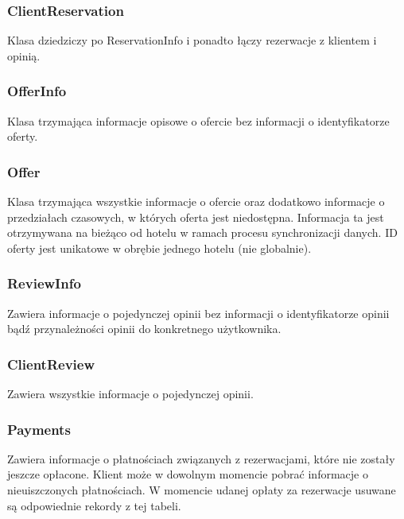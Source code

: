 \documentclass{article}
\begin{document}
\subsubsection{ClientReservation}
Klasa dziedziczy po ReservationInfo i ponadto łączy rezerwacje z klientem i opinią.

\subsubsection{OfferInfo}
Klasa trzymająca informacje opisowe o ofercie bez informacji o identyfikatorze oferty.

\subsubsection{Offer}
Klasa trzymająca wszystkie informacje o ofercie oraz dodatkowo informacje o przedziałach czasowych, w których oferta jest niedostępna. Informacja ta jest otrzymywana na bieżąco od hotelu w ramach procesu synchronizacji danych. ID oferty jest unikatowe w obrębie jednego hotelu (nie globalnie).

\subsubsection{ReviewInfo}
Zawiera informacje o pojedynczej opinii bez informacji o identyfikatorze opinii bądź przynależności opinii do konkretnego użytkownika.

\subsubsection{ClientReview}
Zawiera wszystkie informacje o pojedynczej opinii.

\subsubsection{Payments}
Zawiera informacje o płatnościach związanych z rezerwacjami, które nie zostały jeszcze opłacone. Klient może w dowolnym momencie pobrać informacje o nieuiszczonych płatnościach. W momencie udanej opłaty za rezerwacje usuwane są odpowiednie rekordy z tej tabeli.
\end{document}
